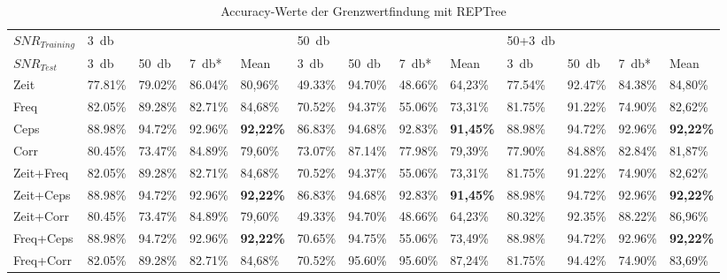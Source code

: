 
\begin{appendices}
\begin{landscape}
\begin{table}[h]
\centering
\caption{Accuracy-Werte der Grenzwertfindung mit REPTree}
\label{tab:reptree_results}
\begin{tabular}{@{}lllllllllllll@{}}
\toprule
$SNR_{Training}$ & \SI{3}{\decibel}     &         &         &                  & \SI{50}{\decibel}    &         &         &                  & 50+\SI{3}{\decibel} &        &         &                  \\ 
$SNR_{Test}$     & \SI{3}{\decibel}     & \SI{50}{\decibel}    & \SI{7}{\decibel}*    & Mean             & \SI{3}{\decibel}     & \SI{50}{\decibel}    & \SI{7}{\decibel}*    & Mean             & \SI{3}{\decibel}     & \SI{50}{\decibel}    & \SI{7}{\decibel}*    & Mean             \\ \midrule
Zeit           & 77.81\% & 79.02\% & 86.04\% & 80,96\%          & 49.33\% & 94.70\% & 48.66\% & 64,23\%          & 77.54\% & 92.47\% & 84.38\% & 84,80\%          \\
Freq           & 82.05\% & 89.28\% & 82.71\% & 84,68\%          & 70.52\% & 94.37\% & 55.06\% & 73,31\%          & 81.75\% & 91.22\% & 74.90\% & 82,62\%          \\
Ceps           & 88.98\% & 94.72\% & 92.96\% & \textbf{92,22\%} & 86.83\% & 94.68\% & 92.83\% & \textbf{91,45\%} & 88.98\% & 94.72\% & 92.96\% & \textbf{92,22\%} \\
Corr           & 80.45\% & 73.47\% & 84.89\% & 79,60\%          & 73.07\% & 87.14\% & 77.98\% & 79,39\%          & 77.90\% & 84.88\% & 82.84\% & 81,87\%          \\
Zeit+Freq      & 82.05\% & 89.28\% & 82.71\% & 84,68\%          & 70.52\% & 94.37\% & 55.06\% & 73,31\%          & 81.75\% & 91.22\% & 74.90\% & 82,62\%          \\
Zeit+Ceps      & 88.98\% & 94.72\% & 92.96\% & \textbf{92,22\%} & 86.83\% & 94.68\% & 92.83\% & \textbf{91,45\%} & 88.98\% & 94.72\% & 92.96\% & \textbf{92,22\%} \\
Zeit+Corr      & 80.45\% & 73.47\% & 84.89\% & 79,60\%          & 49.33\% & 94.70\% & 48.66\% & 64,23\%          & 80.32\% & 92.35\% & 88.22\% & 86,96\%          \\
Freq+Ceps      & 88.98\% & 94.72\% & 92.96\% & \textbf{92,22\%} & 70.65\% & 94.75\% & 55.06\% & 73,49\%          & 88.98\% & 94.72\% & 92.96\% & \textbf{92,22\%} \\
Freq+Corr      & 82.05\% & 89.28\% & 82.71\% & 84,68\%          & 70.52\% & 95.60\% & 95.60\% & 87,24\%          & 81.75\% & 94.42\% & 74.90\% & 83,69\%          \\ \bottomrule
\end{tabular}
\end{table}


\end{landscape}
\end{appendices}
